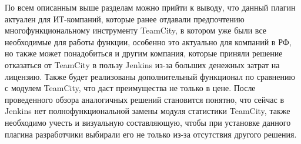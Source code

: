 По всем описанным выше разделам можно прийти к выводу, что данный плагин актуален для ИТ-компаний, которые ранее отдавали предпочтению многофункциональному инструменту TeamCity, в котором уже были все необходимые для работы функции, особенно это актуально для компаний в РФ, но также может понадобиться и другим компания, которые приняли решение отказаться от TeamCity в пользу Jenkins из-за больших денежных затрат на лицензию. Также будет реализованы дополнительный функционал по сравнению с модулем TeamCity, что даст преимущества не только в цене. После проведенного обзора аналогичных решений становится понятно, что сейчас в Jenkins нет полнофункциональной замены модуля статистики TeamCity, также необходимо учесть и визуальную составляющую, чтобы при установке данного плагина разработчики выбирали его не только из-за отсутствия другого решения.













%
%

%
%







